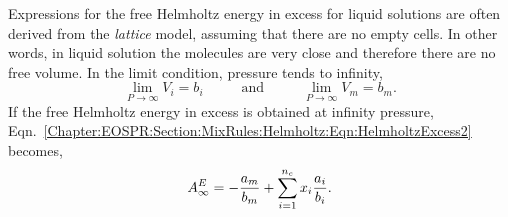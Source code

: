 Expressions for the free Helmholtz energy in excess for liquid solutions are often derived from the {\it lattice} model, assuming that there are no empty cells. In other words, in liquid solution the molecules are very close and therefore there are no free volume. In the limit condition, \ie pressure tends to infinity, 
   \begin{displaymath}
      \lim_{P\rightarrow\infty} V_{i} = b_{i} \hspace{1cm}\text{ and }\hspace{1cm} \lim_{P\rightarrow\infty} V_{m} = b_{m}.
   \end{displaymath}
If the free Helmholtz energy in excess is obtained at infinity pressure, Eqn.~\ref{Chapter:EOSPR:Section:MixRules:Helmholtz:Eqn:HelmholtzExcess2} becomes,
   \begin{equation}
     A_{\infty}^{E} = -\displaystyle\frac{a_{m}}{b_{m}} + \sum\limits_{i=1}^{n_{c}}x_{i}\displaystyle\frac{a_{i}}{b_{i}}.
   \end{equation}

